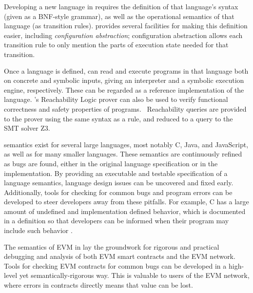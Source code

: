 Developing a new language in \K{} requires the definition of that language's
syntax (given as a BNF-style grammar), as well as the operational semantics of
that language (as transition rules). \K{} provides several facilities for making
this definition easier, including \textit{configuration abstraction};
configuration abstraction allows each transition rule to only mention the parts
of execution state needed for that transition.

Once a language is defined, \K{} can read and execute programs in that language
both on concrete and symbolic inputs, giving an interpreter and a symbolic
execution engine, respectively. These can be regarded as a reference
implementation of the language. \K's Reachability Logic prover can also be used
to verify functional correctness and safety properties of
programs.~\cite{stefanescu-ciobaca-mereuta-moore-serbanuta-rosu-2014-rta}
Reachability queries are provided to the prover using the same syntax as a \K{}
rule, and reduced to a query to the SMT solver Z3.~\cite{de2008z3}

\K{} semantics exist for several large languages, most notably C, Java, and
JavaScript, as well as for many smaller languages. These semantics are
continuously refined as bugs are found, either in the original language
specification or in the \K{} implementation. By providing an executable and
testable specification of a language semantics, language design issues can be
uncovered and fixed early. Additionally, tools for checking for common bugs and
program errors can be developed to steer developers away from these pitfalls.
For example, C has a large amount of undefined and implementation defined
behavior, which is documented in a \K{} definition so that developers can be
informed when their program may include such behavior
\cite{guth-hathhorn-saxena-rosu-2016-cav}.

The semantics of EVM in \K{} lay the groundwork for rigorous and practical
debugging and analysis of both EVM smart contracts and the EVM network. Tools
for checking EVM contracts for common bugs can be developed in a high-level yet
semantically-rigorous way. This is valuable to users of the EVM network, where
errors in contracts directly means that value can be lost.
